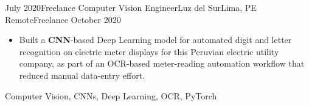 \begin{experiences}
\emptySeparator
\experience
  {July 2020}{Freelance Computer Vision Engineer}{Luz del Sur}{Lima, PE}
  {Remote}{Freelance}
  {October 2020} {
    \begin{itemize}
      \item Built a \textbf{CNN}-based Deep Learning model for automated digit and letter recognition on electric meter displays for this Peruvian electric utility company, as part of an OCR-based meter-reading automation workflow that reduced manual data-entry effort.
    \end{itemize}
  }
  {Computer Vision, CNNs, Deep Learning, OCR, PyTorch}
\end{experiences}

